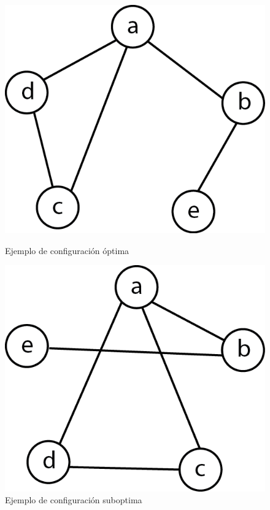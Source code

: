 \begin{figure}[H]
  \hspace{-2em}
	\begin{minipage}[h]{0.48\textwidth}
	\begin{center}
		\centering
		  \includegraphics[scale=1]{imagenes/ej3-ejemplo.png}
		 \caption{Ejemplo de configuración óptima}
	\end{center}
	\end{minipage}
	\hspace{3em}
	\begin{minipage}[h]{0.48\textwidth}
	\begin{center}
	   \centering
	       \includegraphics[scale=1]{imagenes/ej3-ejemplo2.png}
	     \caption{Ejemplo de configuración suboptima}
	\end{center}
	\end{minipage}
\end{figure}

